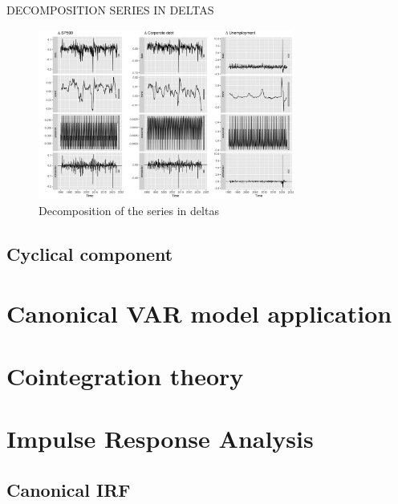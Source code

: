 \documentclass[hidelinks,12pts]{article}
\DeclareMathOperator{\1}{\mathbbm{1}}
\begin{document}




DECOMPOSITION SERIES IN DELTAS 

\begin{figure}[h!]
    \centering
    \includegraphics[width = 0.75\textwidth]{IMAGES/decomposition_iii_deltas.png}
    \caption{Decomposition of the series in deltas}
\end{figure}

    



    \subsection{Cyclical component}






\section{Canonical VAR model application}\label{sec:var}





\section{Cointegration theory}\label{sec:cointegration}




\section{Impulse Response Analysis}\label{sec:irf}
    \subsection{Canonical IRF}\label{sec:canonical_irf}
\end{document}
